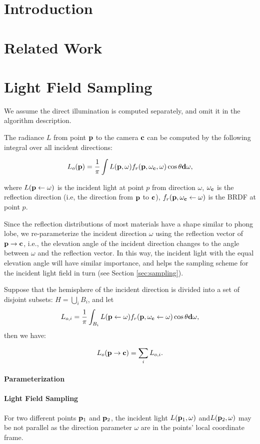 \documentclass[review]{acmsiggraph}
\newcommand{\bfd}{{\bf d}}
\newcommand{\bfp}{{\bf p}}
\newcommand{\bfc}{{\bf c}}
\newcommand{\refSec}[1]{Section \ref{#1}}
\newcommand{\Equation}[1]{
	\begin{equation}
		#1
	\end{equation}
}
\begin{document}
\section{Introduction}

\section{Related Work}

\section{Light Field Sampling}
We assume the direct illumination is computed separately, and omit it in the algorithm description. 

The radiance $L$ from point $\bfp$ to the camera $\bfc$ can be computed by the following integral over all incident directions:
\Equation{\nonumber
	L_o(\bfp) = \frac{1}{\pi} \int L(\bfp, \omega) f_r(\bfp, \omega_\bfc, \omega) \cos\theta \bfd\omega,
}
where $L(\bfp \leftarrow \omega)$ is the incident light at point $p$ from direction $\omega$, $\omega_\bfc$ is the reflection direction (i.e, the direction from $\bfp$ to $\bfc$), $f_r(\bfp,\omega_\bfc\leftarrow\omega)$ is the BRDF at point $p$.

Since the reflection distributions of most materials have a shape similar to phong lobe, we re-parameterize the incident direction $\omega$ using the reflection vector of $\bfp\rightarrow\bfc$, i.e., the elevation angle of the incident direction changes to the angle between $\omega$ and the reflection vector. In this way, the incident light with the equal elevation angle will have similar importance, and helps the sampling scheme for the incident light field  in turn (see \refSec{sec:sampling}).

Suppose that the hemisphere of the incident direction is divided into a set of disjoint subsets: $H = \bigcup_i B_i$, and let 
$$L_{o,i} = \frac{1}{\pi} \int_{B_i} L(\bfp \leftarrow \omega) f_r(\bfp, \omega_\bfc \leftarrow \omega) \cos\theta \bfd\omega, $$ then we have:
\Equation{\nonumber
	L_o(\bfp\rightarrow\bfc)=\sum_i L_{o,i}.
}



\paragraph{Parameterization}


\paragraph{Light Field Sampling}
For two different points $\bfp_1$ and $\bfp_2$, the incident light $L(\bfp_1,\omega)$ and$L(\bfp_2,\omega)$ may be not parallel as the direction parameter $\omega$ are in the points' local coordinate frame.
\end{document}
